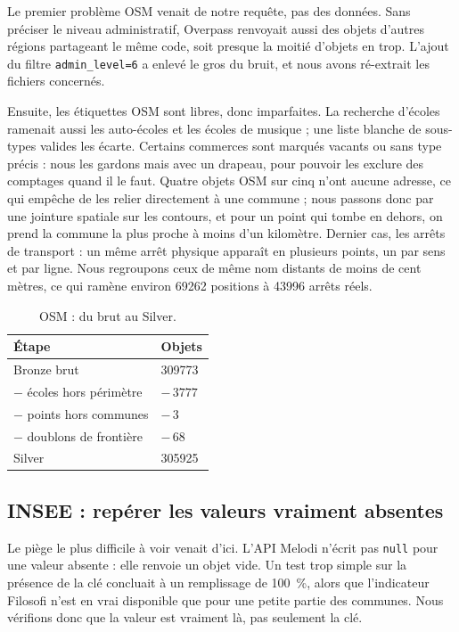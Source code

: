 \documentclass[11pt,a4paper]{article}
\begin{document}
Le premier problème OSM venait de notre requête, pas des données. Sans préciser le niveau administratif, Overpass renvoyait aussi des objets d'autres régions partageant le même code, soit presque la moitié d'objets en trop. L'ajout du filtre \texttt{admin\_level=6} a enlevé le gros du bruit, et nous avons ré-extrait les fichiers concernés.

Ensuite, les étiquettes OSM sont libres, donc imparfaites. La recherche d'écoles ramenait aussi les auto-écoles et les écoles de musique ; une liste blanche de sous-types valides les écarte. Certains commerces sont marqués vacants ou sans type précis : nous les gardons mais avec un drapeau, pour pouvoir les exclure des comptages quand il le faut. Quatre objets OSM sur cinq n'ont aucune adresse, ce qui empêche de les relier directement à une commune ; nous passons donc par une jointure spatiale sur les contours, et pour un point qui tombe en dehors, on prend la commune la plus proche à moins d'un kilomètre. Dernier cas, les arrêts de transport : un même arrêt physique apparaît en plusieurs points, un par sens et par ligne. Nous regroupons ceux de même nom distants de moins de cent mètres, ce qui ramène environ \num{69262} positions à \num{43996} arrêts réels.

\begin{table}[H]
\centering
\caption{OSM : du brut au Silver.}
\begin{tabular}{@{}l R{3cm}@{}}
\toprule
Étape & Objets \\
\midrule
Bronze brut & \num{309773} \\
\quad$-$ écoles hors périmètre & $-\,\num{3777}$ \\
\quad$-$ points hors communes & $-\,3$ \\
\quad$-$ doublons de frontière & $-\,68$ \\
\midrule
Silver & \num{305925} \\
\bottomrule
\end{tabular}
\end{table}

\subsection{INSEE : repérer les valeurs vraiment absentes}

Le piège le plus difficile à voir venait d'ici. L'API Melodi n'écrit pas \texttt{null} pour une valeur absente : elle renvoie un objet vide. Un test trop simple sur la présence de la clé concluait à un remplissage de \SI{100}{\percent}, alors que l'indicateur Filosofi n'est en vrai disponible que pour une petite partie des communes. Nous vérifions donc que la valeur est vraiment là, pas seulement la clé.
\end{document}
